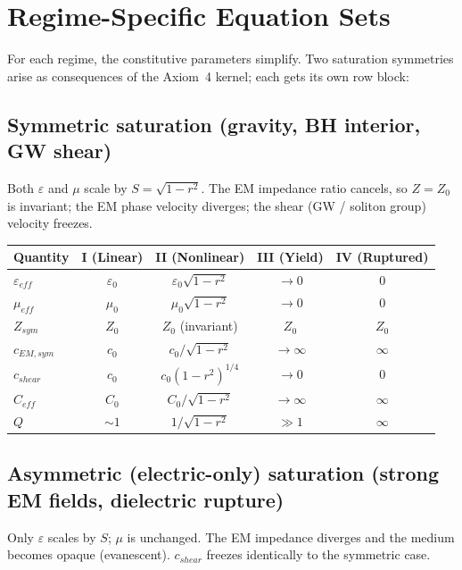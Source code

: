 \section{Regime-Specific Equation Sets}

For each regime, the constitutive parameters simplify. Two saturation symmetries arise as consequences of the Axiom~4 kernel; each gets its own row block:

\subsection*{Symmetric saturation (gravity, BH interior, GW shear)}
Both $\varepsilon$ and $\mu$ scale by $S = \sqrt{1-r^2}$. The EM impedance ratio cancels, so $Z = Z_0$ is invariant; the EM phase velocity diverges; the shear (GW / soliton group) velocity freezes.

\begin{center}
\begin{tabular}{|l|c|c|c|c|}
\hline
\textbf{Quantity} & \textbf{I (Linear)} & \textbf{II (Nonlinear)} & \textbf{III (Yield)} & \textbf{IV (Ruptured)} \\ \hline
$\varepsilon_{eff}$ & $\varepsilon_0$ & $\varepsilon_0 \sqrt{1-r^2}$ & $\to 0$ & 0 \\
$\mu_{eff}$         & $\mu_0$         & $\mu_0 \sqrt{1-r^2}$         & $\to 0$ & 0 \\
$Z_{sym}$           & $Z_0$           & $Z_0$ (invariant)            & $Z_0$        & $Z_0$ \\
$c_{EM,sym}$        & $c_0$           & $c_0 / \sqrt{1-r^2}$         & $\to \infty$ & $\infty$ \\
$c_{shear}$         & $c_0$           & $c_0(1-r^2)^{1/4}$           & $\to 0$      & 0 \\
$C_{eff}$           & $C_0$           & $C_0 / \sqrt{1-r^2}$         & $\to \infty$ & $\infty$ \\
$Q$                 & $\sim 1$        & $1/\sqrt{1-r^2}$             & $\gg 1$      & $\infty$ \\ \hline
\end{tabular}
\end{center}

\subsection*{Asymmetric (electric-only) saturation (strong EM fields, dielectric rupture)}
Only $\varepsilon$ scales by $S$; $\mu$ is unchanged. The EM impedance diverges and the medium becomes opaque (evanescent). $c_{shear}$ freezes identically to the symmetric case.

